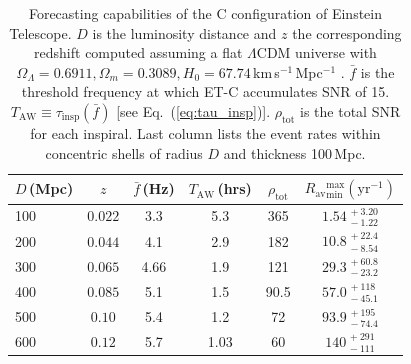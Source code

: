 \documentclass{aa}
\newcommand\T{\rule{0pt}{2.6ex}}       %
\newcommand\B{\rule[-1.2ex]{0pt}{0pt}} %
\begin{document}
%
%
%
%
\begin{table}[h]
\caption{Forecasting capabilities of the C configuration of Einstein Telescope. 
$D$ is the luminosity distance and $z$ the corresponding redshift 
computed assuming a flat $\Lambda$CDM universe with $\Omega_\Lambda = 0.6911, \Omega_m = 0.3089, H_0 = 67.74\,$km\,s$^{-1}\,$Mpc$^{-1}$ \citep{Planck2015}.
$\bar{f}$ is the threshold frequency at which ET-C accumulates SNR of 15.
$T_\text{AW}\equiv \tau_\text{insp}(\bar{f})$ [see Eq.~(\ref{eq:tau_insp})].
$\rho_\text{tot}$ is the total SNR for each inspiral.
Last column lists the event rates %
within concentric shells of radius $D$ and thickness 100\,Mpc.}
\label{table:ET}
\centering
\begin{tabular}{lccccc}
\hline\hline
$D\,$(Mpc) &  $z$ & $\bar{f}\,$(Hz) &  $T_\text{AW}\,$(hrs)& ${\rho}_\text{tot}$ &$ R_\text{av}{}^\text{max}_\text{min}(\text{yr}^{-1})$ \T\B \\
\hline
100 & $ 0.022$ & 3.3 & 5.3 & 365 & $1.54^{\,+3.20}_{\,-1.22}$ \T \B \\
200 & $ 0.044$ & 4.1 & 2.9 & 182 & $10.8^{\,+22.4}_{\,-8.54}$ \T \B \\
300 & $ 0.065$ & 4.66 & 1.9 & 121 & $29.3^{\,+60.8}_{\,-23.2}$ \T \B \\
400 & $ 0.085$ & 5.1 & 1.5 & 90.5 & $57.0^{\,+118}_{\,-45.1}$ \T \B \\
500 & $ 0.10$ & 5.4 & 1.2 & 72 & $93.9^{\,+195}_{\,-74.4}$ \T \B \\
600 & $ 0.12$ & 5.7 & 1.03 & 60 & $140^{\,+291}_{\,-111}$ \T \B \\
\hline\hline
\end{tabular}
\end{table}
%
%
%
%
%
%
%
\end{document}
